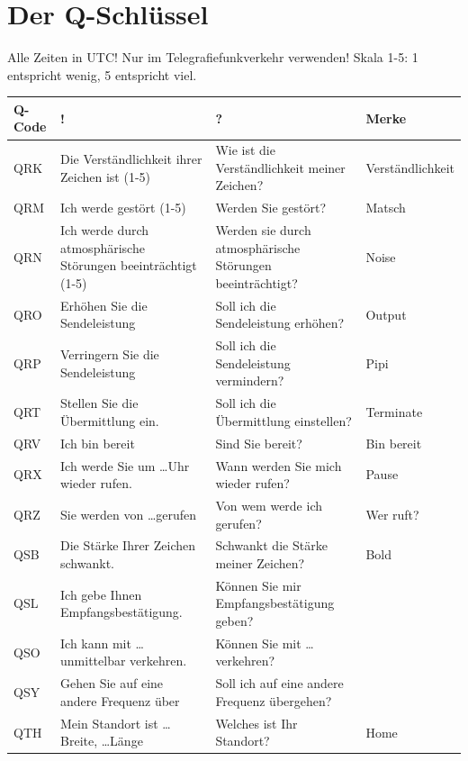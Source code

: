 \documentclass[11pt,BCOR=8.5mm]{scrartcl}
\begin{document}
\section{Der Q-Schlüssel}

Alle Zeiten in UTC! Nur im Telegrafiefunkverkehr verwenden! Skala 1-5: 1
entspricht wenig, 5 entspricht viel.

\begin{table}[h]
  \centering
  \begin{tabular}{| l | p{4.3cm} | p{4.3cm} | l |}
  \hline
  Q-Code & ! & ? & Merke \\
  \hline
  \hline
  QRK & Die Verständlichkeit ihrer Zeichen ist (1-5) & Wie ist die
  Verständlichkeit meiner Zeichen? & Verständlichkeit \\
  \hline
  QRM & Ich werde gestört (1-5) & Werden Sie gestört? & Matsch \\
  \hline
  QRN & Ich werde durch atmosphärische Störungen beeinträchtigt (1-5) &
  Werden sie durch atmosphärische Störungen beeinträchtigt? &
  Noise \\
  \hline
  QRO & Erhöhen Sie die Sendeleistung & Soll ich die
  Sendeleistung erhöhen? & Output \\
  \hline
  QRP & Verringern Sie die Sendeleistung & Soll ich die
  Sendeleistung vermindern? & Pipi \\
  \hline
  QRT & Stellen Sie die Übermittlung ein. & Soll ich die
  Übermittlung einstellen? & Terminate \\
  \hline
  QRV & Ich bin bereit & Sind Sie bereit? & Bin bereit \\
  \hline
  QRX & Ich werde Sie um \ldots Uhr wieder rufen. & Wann werden
  Sie mich wieder rufen? & Pause \\
  \hline
  QRZ & Sie werden von \ldots gerufen & Von wem werde ich
  gerufen? & Wer ruft? \\
  \hline
  QSB & Die Stärke Ihrer Zeichen schwankt. & Schwankt die Stärke
  meiner Zeichen? & Bold \\
  \hline
  QSL & Ich gebe Ihnen Empfangsbestätigung. & Können Sie mir
  Empfangsbestätigung geben? & \\
  \hline
  QSO & Ich kann mit \ldots unmittelbar verkehren. & Können Sie
  mit \ldots verkehren? & \\
  \hline
  QSY & Gehen Sie auf eine andere Frequenz über & Soll ich auf
  eine andere Frequenz übergehen? & \\
  \hline
  QTH & Mein Standort ist \ldots Breite, \ldots Länge & Welches
  ist Ihr Standort? & Home \\
  \hline
\end{tabular}
\end{table}
\end{document}
